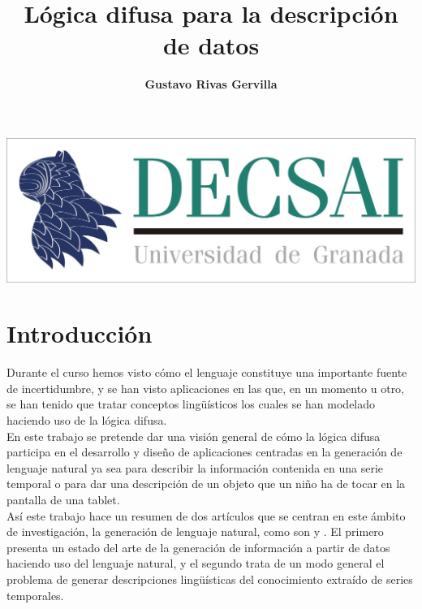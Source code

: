 \documentclass[10pt,a4paper]{article}
\author{\textbf{Gustavo Rivas Gervilla}}
\title{\textcolor{deepblue}{\textbf{Lógica difusa para la descripción de datos}}}
\date{}
\begin{document}
\maketitle
\begin{center}
\includegraphics[scale=0.5]{img/decsai}
\end{center}

\newpage

\tableofcontents

\newpage
{} %

\section{Introducción}

Durante el curso hemos visto cómo el lenguaje constituye una importante fuente de incertidumbre, y se han visto aplicaciones en las que, en un momento u otro, se han tenido que tratar conceptos lingüísticos los cuales se han modelado haciendo uso de la lógica difusa.\\

En este trabajo se pretende dar una visión general de cómo la lógica difusa participa en el desarrollo y diseño de aplicaciones centradas en la generación de lenguaje natural ya sea para describir la información contenida en una serie temporal o para dar una descripción de un objeto que un niño ha de tocar en la pantalla de una tablet.\\

Así este trabajo hace un resumen de dos artículos que se centran en este ámbito de investigación, la generación de lenguaje natural, como son \cite{GLN} y \cite{GLiDTS}. El primero presenta un estado del arte de la generación de información a partir de datos haciendo uso del lenguaje natural, y el segundo trata de un modo general el problema de generar descripciones lingüísticas del conocimiento extraído de series temporales.\\
\end{document}
